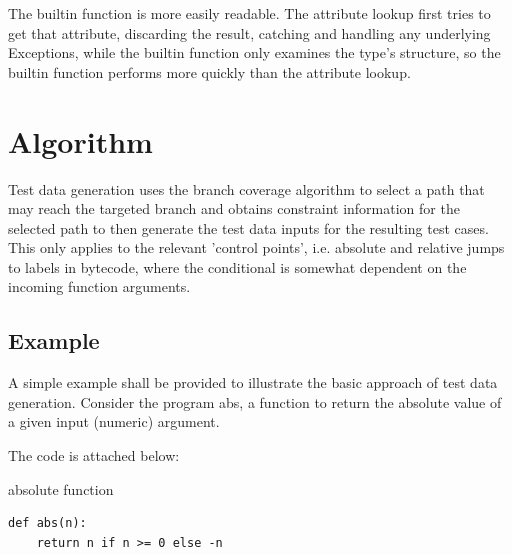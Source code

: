 \documentclass{icldt}
\numberwithin{equation}{section}       %
\begin{document}
{{The builtin function is more easily readable. The attribute lookup first tries to get that attribute, discarding the result, catching and handling any underlying Exceptions, while the builtin function only examines the type's structure, so the builtin function performs more quickly than the attribute lookup.
\section{Algorithm}
Test data generation uses the branch coverage algorithm to select a path that may reach the targeted branch and obtains constraint information for the selected path to then generate the test data inputs for the resulting test cases. This only applies to the relevant 'control points', i.e. absolute and relative jumps to labels in bytecode, where the conditional is somewhat dependent on the incoming function arguments.

\subsection{Example}
A simple example shall be provided to illustrate the basic approach of test data generation. Consider the program \textsf{abs}, a function to return the absolute value of a given input (numeric) argument.

The code is attached below:
\begin{listing}[H]
	\caption{absolute function}
	\begin{verbatim}
def abs(n):
    return n if n >= 0 else -n
	\end{verbatim}
	\label{lst:py-abs}
\end{listing}

}}
\end{document}
